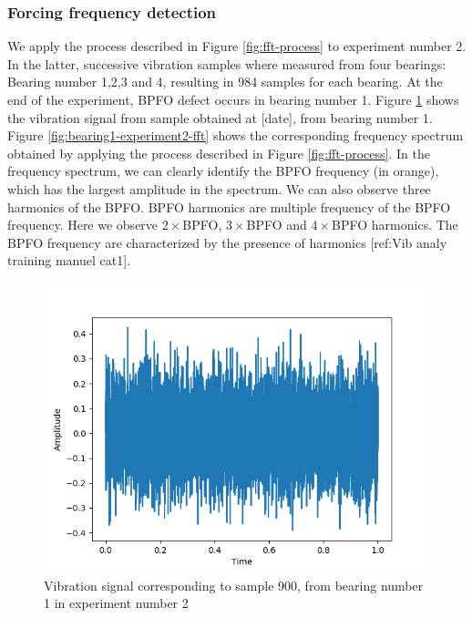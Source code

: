 \documentclass[../Main/thesis.tex]{subfiles}
\begin{document}
\subsubsection{Forcing frequency detection}
We apply the process described in Figure \ref{fig:fft-process} to experiment number 2.
In the latter, successive vibration samples where measured from four bearings: Bearing number 1,2,3 and 4, resulting in 984 samples for each bearing.  At the end of the experiment, BPFO defect occurs in bearing number 1. Figure \ref{fig:bearing1-experiment2} shows the vibration signal from sample obtained at [date], from bearing number 1. Figure \ref{fig:bearing1-experiment2-fft} shows the corresponding frequency spectrum obtained by applying the process described in Figure \ref{fig:fft-process}.
\justify
In the frequency spectrum, we can clearly identify the BPFO frequency (in orange), which has the largest amplitude in the spectrum. We can also observe three harmonics of the BPFO.
BPFO harmonics are multiple frequency of the BPFO frequency. Here we observe $2\times$BPFO, $3\times$BPFO and $4\times$BPFO harmonics. The BPFO frequency are characterized by the presence of harmonics [ref:Vib analy training manuel cat1]. 
\begin{figure}[H] %
   \centering
   \includegraphics[width=4.5in]{../fig/experiment2_bearing1.png} 
   \caption{Vibration signal corresponding to sample 900, from bearing number 1 in  experiment number 2}
   \label{fig:bearing1-experiment2}
\end{figure}
\end{document}
